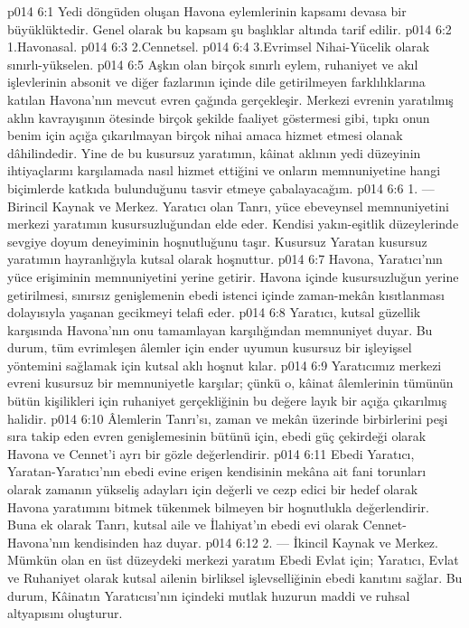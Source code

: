 \vs p014 6:1 Yedi döngüden oluşan Havona eylemlerinin kapsamı devasa bir büyüklüktedir. Genel olarak bu kapsam şu başlıklar altında tarif edilir.
\vs p014 6:2 1.\bibnobreakspace Havonasal.
\vs p014 6:3 2.\bibnobreakspace Cennetsel.
\vs p014 6:4 3.\bibnobreakspace Evrimsel Nihai\hyp{}Yücelik olarak sınırlı\hyp{}yükselen.
\vs p014 6:5 Aşkın olan birçok sınırlı eylem, ruhaniyet ve akıl işlevlerinin absonit ve diğer fazlarının içinde dile getirilmeyen farklılıklarına katılan Havona’nın mevcut evren çağında gerçekleşir. Merkezi evrenin yaratılmış aklın kavrayışının ötesinde birçok şekilde faaliyet göstermesi gibi, tıpkı onun benim için açığa çıkarılmayan birçok nihai amaca hizmet etmesi olanak dâhilindedir. Yine de bu kusursuz yaratımın, kâinat aklının yedi düzeyinin ihtiyaçlarını karşılamada nasıl hizmet ettiğini ve onların memnuniyetine hangi biçimlerde katkıda bulunduğunu tasvir etmeye çabalayacağım.
\vs p014 6:6 1.\bibnobreakspace {} --- Birincil Kaynak ve Merkez. Yaratıcı olan Tanrı, yüce ebeveynsel memnuniyetini merkezi yaratımın kusursuzluğundan elde eder. Kendisi yakın\hyp{}eşitlik düzeylerinde sevgiye doyum deneyiminin hoşnutluğunu taşır. Kusursuz Yaratan kusursuz yaratımın hayranlığıyla kutsal olarak hoşnuttur.
\vs p014 6:7 Havona, Yaratıcı’nın yüce erişiminin memnuniyetini yerine getirir. Havona içinde kusursuzluğun yerine getirilmesi, sınırsız genişlemenin ebedi istenci içinde zaman\hyp{}mekân kısıtlanması dolayısıyla yaşanan gecikmeyi telafi eder.
\vs p014 6:8 Yaratıcı, kutsal güzellik karşısında Havona’nın onu tamamlayan karşılığından memnuniyet duyar. Bu durum, tüm evrimleşen âlemler için ender uyumun kusursuz bir işleyişsel yöntemini sağlamak için kutsal aklı hoşnut kılar.
\vs p014 6:9 Yaratıcımız merkezi evreni kusursuz bir memnuniyetle karşılar; çünkü o, kâinat âlemlerinin tümünün bütün kişilikleri için ruhaniyet gerçekliğinin bu değere layık bir açığa çıkarılmış halidir.
\vs p014 6:10 Âlemlerin Tanrı’sı, zaman ve mekân üzerinde birbirlerini peşi sıra takip eden evren genişlemesinin bütünü için, ebedi güç çekirdeği olarak Havona ve Cennet’i ayrı bir gözle değerlendirir.
\vs p014 6:11 Ebedi Yaratıcı, Yaratan\hyp{}Yaratıcı’nın ebedi evine erişen kendisinin mekâna ait fani torunları olarak zamanın yükseliş adayları için değerli ve cezp edici bir hedef olarak Havona yaratımını bitmek tükenmek bilmeyen bir hoşnutlukla değerlendirir. Buna ek olarak Tanrı, kutsal aile ve İlahiyat’ın ebedi evi olarak Cennet\hyp{}Havona’nın kendisinden haz duyar.
\vs p014 6:12 2.\bibnobreakspace {} --- İkincil Kaynak ve Merkez. Mümkün olan en üst düzeydeki merkezi yaratım Ebedi Evlat için; Yaratıcı, Evlat ve Ruhaniyet olarak kutsal ailenin birliksel işlevselliğinin ebedi kanıtını sağlar. Bu durum, Kâinatın Yaratıcısı’nın içindeki mutlak huzurun maddi ve ruhsal altyapısını oluşturur.

